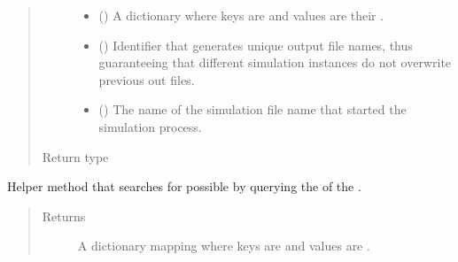 \documentclass[letterpaper,10pt,english]{sphinxmanual}
\begin{document}
\begin{fulllineitems}
\begin{fulllineitems}
\begin{quote}
\begin{description}
\begin{itemize}
\item {} 
 ({\hyperref[\detokenize{app:app.type_hints.NodeDict}]{}}) \textendash{} A dictionary where keys are {\hyperref[\detokenize{app.domain:app.domain.network_nodes.Node.id}]{}} and values are their
{\hyperref[\detokenize{app.domain:app.domain.network_nodes.Node}]{}}.

\item {} 
 () \textendash{} Identifier that generates unique output file names,
thus guaranteeing that different simulation instances do not
overwrite previous out files.

\item {} 
 () \textendash{} The name of the simulation file name that started
the simulation process.

\end{itemize}

\item[{Return type}] \leavevmode
{}

\end{description}\end{quote}

\end{fulllineitems}


\begin{fulllineitems}
\label{\detokenize{app.domain:app.domain.cluster_groups.Cluster._get_new_members}}
Helper method that searches for possible
{\hyperref[\detokenize{app.domain:app.domain.network_nodes.Node}]{}} by querying
the {\hyperref[\detokenize{app.domain:app.domain.cluster_groups.Cluster.master}]{}} of the .
\begin{quote}\begin{description}
\item[{Returns}] \leavevmode
A dictionary mapping where keys are
{\hyperref[\detokenize{app.domain:app.domain.network_nodes.Node.id}]{}}
and values are
{\hyperref[\detokenize{app.domain:app.domain.network_nodes.Node}]{}}.


\end{description}
\end{quote}
\end{fulllineitems}
\end{fulllineitems}
\end{document}
